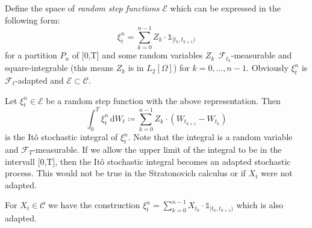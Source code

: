 Define the space of \emph{random step functions} \(\mathcal{E}\) which can be expressed in the following form:
\[\xi_t^{n} = \sum^{n-1}_{k=0}Z_k\cdot\mathbb{1}_{[t_k,t_{k+1})}\]
for a partition \(P_n\) of [0,T] and some random variables \(Z_k \:\:\mathcal{F}_{t_k}\)-measurable and square-integrable (this means \(Z_k\) is in \(L_2[\Omega]\)) for \(k\!=\!0,\dots,\! n\!-\!1\).
Obviously \(\xi_t^{n}\) is \(\mathcal{F}_t\)-adapted and \(\mathcal{E}\subset\mathcal{C}\).
\begin{definition}
Let \(\xi_t^{n}\!\in\mathcal{E}\) be a random step function with the above representation. Then 
\begin{displaymath}
\int_0^T \! \xi_t^{n}\, \mathrm{d}W_{t}\coloneqq\sum^{n-1}_{k=0}Z_k\cdot(W_{t_{k+1}}-W_{t_{k}})
\end{displaymath}
is the It\^o stochastic integral of \(\xi_t^{n}\). Note that the integral is a random variable and \(\mathcal{F}_T\)-measurable. If we allow the upper limit of the integral to be in the intervall [0,T], then the It\^o stochastic integral becomes an adapted
stochastic process. This would not be true in the Stratonovich calculus or if \(X_t\) were not adapted.
\end{definition}
For \(X_t\in\mathcal{C}\) we have the construction \(\xi_t^{n}=\sum^{n-1}_{k=0}X_{t_k}\cdot\mathbb{1}_{[t_k,t_{k+1})}\) which is also adapted. 

